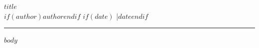 \documentclass[11pt, letterpaper]{article}
\begin{document}
\begin{center}
  {\LARGE\bfseries $title$}\\[0.4em]
  \small $if(author)$$author$$endif$
  $if(date)$ \quad|\quad $date$$endif$
\end{center}

\vspace{0.5em}
\hrule
\vspace{0.8em}

$body$
\end{document}
